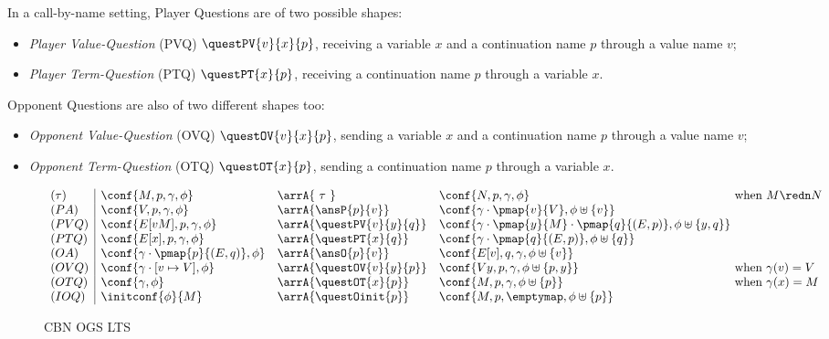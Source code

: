 
\noindent
In a call-by-name setting, Player Questions are of two possible shapes:
 \begin{itemize}
  \item \emph{Player Value-Question} (PVQ) $\questPV{v}{x}{p}$,
  receiving a variable $x$ and a continuation name $p$ through a value name $v$;
  \item \emph{Player Term-Question} (PTQ) $\questPT{x}{p}$,
  receiving a continuation name $p$ through a variable $x$.
 \end{itemize}
\noindent
 Opponent Questions are also of two different shapes too:
  \begin{itemize}
   \item \emph{Opponent Value-Question} (OVQ) $\questOV{v}{x}{p}$,
  sending a variable $x$ and a continuation name $p$ through a value name $v$;
  \item \emph{Opponent Term-Question} (OTQ) $\questOT{x}{p}$,
  sending a continuation name $p$ through a variable $x$.
 \end{itemize}
  

 
 
 \begin{figure}
 \setlength{\arraycolsep}{3pt}%
 \[
  \begin{array}{l|lll@{}l}
   (\tau) & \conf{M,p,\gamma,\phi} & \arrA{\ \tau \ } & 
     \conf{N,p,\gamma,\phi} & \text{ when } M \redn N\\
%
   (PA) & \conf{V,p,\gamma,\phi} & \arrA{\ansP{p}{v}} & 
     \conf{\gamma \cdot \pmap{v}{V},\phi \uplus \{v\}} \\
%
   (PVQ) & \conf{E[vM],p,\gamma,\phi} & \arrA{\questPV{v}{y}{q}} & 
     \conf{\gamma \cdot \pmap{y}{M}\cdot \pmap{q}{(E,p)},\phi \uplus \{y,q\}} \\
%
   (PTQ) & \conf{E[x],p,\gamma,\phi} & \arrA{\questPT{x}{q}} & 
     \conf{\gamma \cdot \pmap{q}{(E,p)},\phi \uplus \{q\}} \\
%
   (OA) & \conf{\gamma\cdot \pmap{p}{(E,q)},\phi} & \arrA{\ansO{p}{v}} & 
     \conf{E[v],q,\gamma,\phi \uplus \{v\}} \\ %
%
   (OVQ) & \conf{\gamma \cdot [v \mapsto V],\phi} & \arrA{\questOV{v}{y}{p}} & 
     \conf{V y,p,\gamma,\phi \uplus \{p,y\}} & \text{ when } \gamma(v) = V\\
%
   (OTQ) & \conf{\gamma,\phi} & \arrA{\questOT{x}{p}} & 
     \conf{M,p,\gamma,\phi \uplus \{p\}} & \text{ when } \gamma(x) = M\\
%
   (IOQ) & \initconf{\phi}{M} & \arrA{\questOinit{p}} &
     \conf{M,p,\emptymap,\phi \uplus \{p\}}
%
  \end{array}
 \]
 \caption{CBN OGS LTS}
\label{fig:scbn-lts}
\end{figure}


